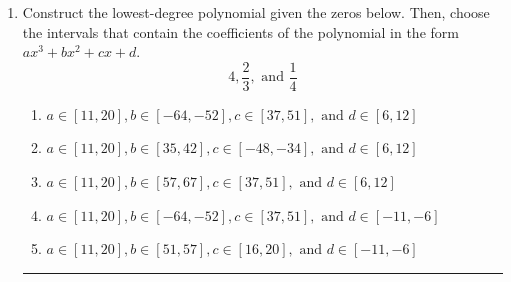 \documentclass[14pt]{extbook}
\newcommand{\litem}[1]{\item#1\hspace*{-1cm}\rule{\textwidth}{0.4pt}}
\begin{document}
\begin{enumerate}
\litem{
Construct the lowest-degree polynomial given the zeros below. Then, choose the intervals that contain the coefficients of the polynomial in the form $ax^3+bx^2+cx+d$.\[ 4, \frac{2}{3}, \text{ and } \frac{1}{4} \]\begin{enumerate}[label=\Alph*.]
\item \( a \in [11, 20], b \in [-64, -52], c \in [37, 51], \text{ and } d \in [6, 12] \)
\item \( a \in [11, 20], b \in [35, 42], c \in [-48, -34], \text{ and } d \in [6, 12] \)
\item \( a \in [11, 20], b \in [57, 67], c \in [37, 51], \text{ and } d \in [6, 12] \)
\item \( a \in [11, 20], b \in [-64, -52], c \in [37, 51], \text{ and } d \in [-11, -6] \)
\item \( a \in [11, 20], b \in [51, 57], c \in [16, 20], \text{ and } d \in [-11, -6] \)


\end{enumerate}}
\end{enumerate}
\end{document}
